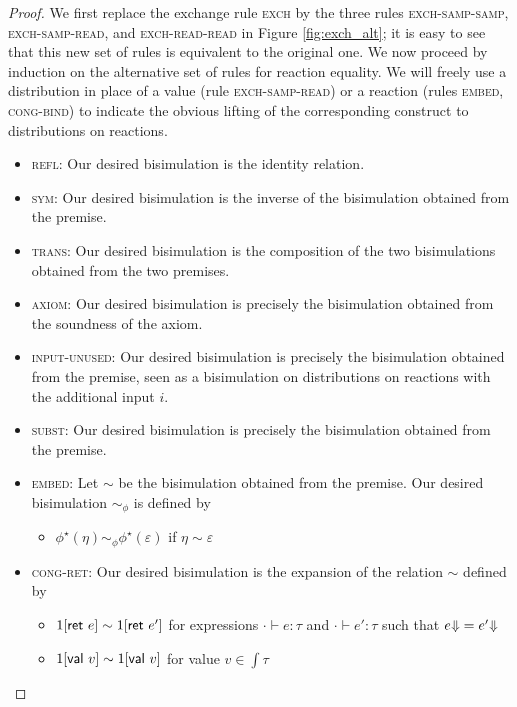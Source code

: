 \begin{proof}
We first replace the exchange rule \textsc{exch} by the three rules \textsc{exch-samp-samp}, \textsc{exch-samp-read}, and \textsc{exch-read-read} in Figure \ref{fig:exch_alt}; it is easy to see that this new set of rules is equivalent to the original one. We now proceed by induction on the alternative set of rules for reaction equality. We will freely use a distribution in place of a value (rule \textsc{exch-samp-read}) or a reaction (rules \textsc{embed}, \textsc{cong-bind}) to indicate the obvious lifting of the corresponding construct to distributions on reactions.

\begin{itemize}
\item \textsc{refl}: Our desired bisimulation is the identity relation.
\item \textsc{sym}: Our desired bisimulation is the inverse of the bisimulation obtained from the premise.
\item \textsc{trans}: Our desired bisimulation is the composition of the two bisimulations obtained from the two premises.
\item \textsc{axiom}: Our desired bisimulation is precisely the bisimulation obtained from the soundness of the axiom.
\item \textsc{input-unused}: Our desired bisimulation is precisely the bisimulation obtained from the premise, seen as a bisimulation on distributions on reactions with the additional input $i$.
\item \textsc{subst}: Our desired bisimulation is precisely the bisimulation obtained from the premise.
\item \textsc{embed}: Let $\sim$ be the bisimulation obtained from the premise. Our desired bisimulation $\sim_\phi$ is defined by
\begin{itemize}
\item $\phi^\star(\eta) \sim_\phi \phi^\star(\varepsilon)$ if $\eta \sim \varepsilon$
\end{itemize}
\item \textsc{cong-ret}: Our desired bisimulation is the expansion of the relation $\sim$ defined by
\begin{itemize}
\item $1[\mathsf{ret} \ e] \sim 1[\mathsf{ret} \ e']$ for expressions $\cdot \vdash e : \tau$ and $\cdot \vdash e' : \tau$ such that ${e \hspace{-2.5pt} \Downarrow} = {e' \hspace{-2.5pt} \Downarrow}$
\item $1[\mathsf{val} \ v] \sim 1[\mathsf{val} \ v]$ for value $v \in \int{\tau}$
\end{itemize}

\end{itemize}
\end{proof}
